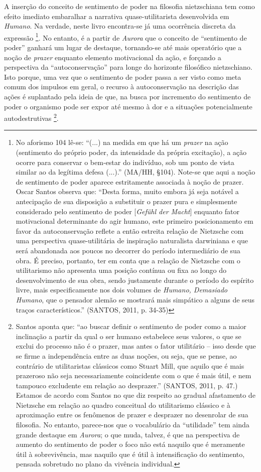 \documentclass[
	12pt,				%
	openright,			%
	oneside,			%
	a4paper,			%
	english,			%
	french,				%
	spanish,			%
	brazil				%
	]{abntex2}
\begin{document}
	A inserção do conceito de sentimento de poder na filosofia nietzschiana tem como efeito imediato embaralhar a narrativa quase-utilitarista desenvolvida em \textit{Humano}. Na verdade, neste livro encontra-se já uma ocorrência discreta da expressão
\footnote{No aforismo 104 lê-se: “(...) na medida em que há um \textit{prazer} na ação (sentimento do próprio poder, da intensidade da própria excitação), a ação ocorre para conservar o bem-estar do indivíduo, sob um ponto de vista similar ao da legítima defesa (...).” (MA/HH, §104). Note-se que aqui a noção de sentimento de poder aparece estritamente associada à noção de prazer. Oscar Santos observa que: “Desta forma, muito embora já seja notável a antecipação de sua disposição a substituir o prazer pura e simplesmente considerado pelo sentimento de poder [\textit{Gefühl der Macht}] enquanto fator motivacional determinante do agir humano, este primeiro posicionamento em favor da autoconservação reflete a então estreita relação de Nietzsche com uma perspectiva quase-utilitária de inspiração naturalista darwiniana e que será abandonada aos poucos no decorrer do período intermediário de sua obra. É preciso, portanto, ter em conta que a relação de Nietzsche com o utilitarismo não apresenta uma posição contínua ou fixa ao longo do desenvolvimento de sua obra, sendo justamente durante o período do espírito livre, mais especificamente nos dois volumes de \textit{Humano, Demasiado Humano}, que o pensador alemão se mostrará mais simpático a alguns de seus traços característicos.” (SANTOS, 2011, p. 34-35)}. 
No entanto, é a partir de \textit{Aurora} que o conceito de “sentimento de poder” ganhará um lugar de destaque, tornando-se até mais operatório que a noção de \textit{prazer} enquanto elemento motivacional da ação, e forçando a perspectiva da “autoconservação” para longe do horizonte filosófico nietzschiano. Isto porque, uma vez que o sentimento de poder passa a ser visto como meta comum dos impulsos em geral, o recurso à autoconservação na descrição das ações é suplantado pela ideia de que, na busca por incremento do sentimento de poder o organismo pode ser expor até mesmo à dor e a situações potencialmente autodestrutivas
\footnote{Santos aponta que: “ao buscar definir o sentimento de poder como a maior inclinação a partir da qual o ser humano estabelece seus valores, o que se exclui do processo não é o prazer, mas antes o fator utilitário – isso desde que se firme a independência entre as duas noções, ou seja, que se pense, ao contrário de utilitaristas clássicos como Stuart Mill, que aquilo que é mais prazeroso não seja necessariamente coincidente com o que é mais útil, e nem tampouco excludente em relação ao desprazer.” (SANTOS, 2011, p. 47.) Estamos de acordo com Santos no que diz respeito ao gradual afastamento de Nietzsche em relação ao quadro conceitual do utilitarismo clássico e à aproximação entre os fenômenos de prazer e desprazer no desenrolar de sua filosofia. No entanto, parece-nos que o vocabulário da “utilidade” tem ainda grande destaque em \textit{Aurora}; o que muda, talvez, é que na perspectiva de aumento do sentimento de poder o foco não está naquilo que é meramente útil à sobrevivência, mas naquilo que é útil à intensificação do sentimento, pensada sobretudo no plano da vivência individual. }. 
	
\end{document}
